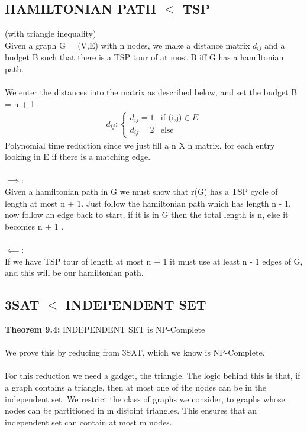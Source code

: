\subsection{HAMILTONIAN PATH $\le$ TSP}
(with triangle inequality)\\
Given a graph G = (V,E) with n nodes, we make a distance matrix $d_{ij}$ and a budget B such that there is a TSP tour of at most B iff G has a hamiltonian path.\\\\
We enter the distances into the matrix as described below, and set the budget B = n + 1
\begin{gather*}  
d_{ij}: 
\begin{cases}
  d_{ij} = 1 & \text{if (i,j)} \in E\\    
  d_{ij} = 2 & \text{else}
\end{cases}
\end{gather*}
Polynomial time reduction since we just fill a n X n matrix, for each entry looking in E if there is a matching edge.\\\\
$\implies$: \\
Given a hamiltonian path in G we must show that r(G) has a TSP cycle of length at most n + 1. Just follow the hamiltonian path which has length n - 1, now follow an edge back to start, if it is in G then the total length is n, else it becomes n + 1 .  \\\\
$\impliedby$: \\
If we have TSP tour of length at most n + 1 it must use at least n - 1 edges of G, and this will be our hamiltonian path. 
\subsection{3SAT $\le$ INDEPENDENT SET}
\textbf{Theorem 9.4:} INDEPENDENT SET is NP-Complete\\\\
We prove this by reducing from 3SAT, which we know is NP-Complete.\\\\
For this reduction we need a gadget, the triangle. The logic behind this is that, if a graph contains a triangle, then at most one of the nodes can be in the independent set. We restrict the class of graphs we consider, to graphs whose nodes can be partitioned in m disjoint triangles. This ensures that an independent set can contain at most m nodes. \\

